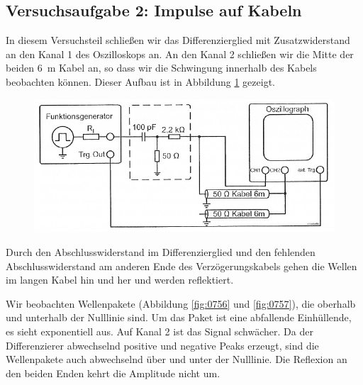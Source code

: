 \FloatBarrier
\subsection{Versuchsaufgabe 2: Impulse auf Kabeln}

In diesem Versuchsteil schließen wir das Differenzierglied mit Zusatzwiderstand
an den Kanal 1 des Oszilloskops an. An den Kanal 2 schließen wir die Mitte der
beiden \SI{6}{\meter} Kabel an, so dass wir die Schwingung innerhalb des Kabels
beobachten können. Dieser Aufbau ist in Abbildung \ref{fig:1-7} gezeigt.

\begin{figure}[htbp]
	\centering
	\includegraphics[width=\textwidth]{Schaltplan/1-7.png}
	\caption{%
		\cite[Abbildung~1.7]{physik313-Anleitung}
	}
	\label{fig:1-7}
\end{figure}

Durch den Abschlusswiderstand im Differenzierglied und den
fehlenden Abschlusswiderstand am anderen Ende des Verzögerungskabels gehen die
Wellen im langen Kabel hin und her und werden reflektiert.

Wir beobachten Wellenpakete (Abbildung \ref{fig:0756} und \ref{fig:0757}), die
oberhalb und unterhalb der Nulllinie sind. Um das Paket ist eine abfallende
Einhüllende, es sieht exponentiell aus. Auf Kanal 2 ist das Signal schwächer.
Da der Differenzierer abwechselnd positive und negative Peaks erzeugt, sind die
Wellenpakete auch abwechselnd über und unter der Nulllinie. Die Reflexion an
den beiden Enden kehrt die Amplitude nicht um.

